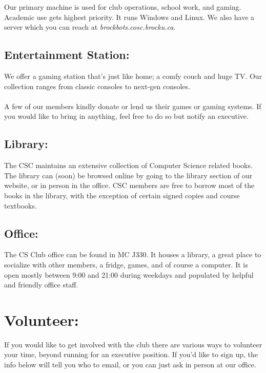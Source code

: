 \documentclass[10pt,letterpaper]{article}
\begin{document}
\begin{multicols}{3}
Our primary machine is used for club operations, school work, and gaming.
Academic use gets highest priority. It runs Windows and Linux.
We also have a server which you can reach at \emph{brockbots.cosc.brocku.ca}.

\subsection*{Entertainment Station:}

We offer a gaming station that's just like home; a comfy couch and huge TV.
Our collection ranges from classic consoles to next-gen consoles.\\
\\
A few of our members kindly donate or lend us their games or gaming systems. If you would
like to bring in anything, feel free to do so but notify an executive.

\subsection*{Library:}

The CSC maintains an extensive collection of Computer Science related 
books. The library can (soon) be browsed online by going to the library section of our
website, or in person in the office. CSC members are free to borrow most of 
the books in the library, with the exception of certain signed copies and
course textbooks.

\subsection*{Office:}

The CS Club office can be found in MC J330. It houses a library, a great
place to socialize with other members, a fridge, games, and of
course a computer. It is open mostly between 9:00 and 21:00 during weekdays
and populated by helpful and friendly office staff.


\section*{Volunteer:}

If you would like to get involved with the club there are various ways to
volunteer your time, beyond running for an executive position. If you'd like
to sign up, the info below will tell you who to email, or you can just ask
in person at our office.


\end{multicols}
\end{document}
